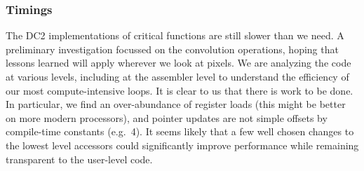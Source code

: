 
\subsubsection{Timings}
\label{fwTiming}

The DC2 implementations of critical functions are still slower than we
need.  A preliminary investigation focussed on the convolution
operations, hoping that lessons learned will apply wherever we look at
pixels.  We are analyzing the code at various levels, including at the
assembler level to understand the efficiency of our most
compute-intensive loops.  It is clear to us that there is work to be
done.  In particular, we find an over-abundance of register loads
(this might be better on more modern processors), and pointer updates
are not simple offsets by compile-time constants (e.g.~4).  It seems
likely that a few well chosen changes to the lowest level accessors
could significantly improve performance while remaining transparent to
the user-level code.


